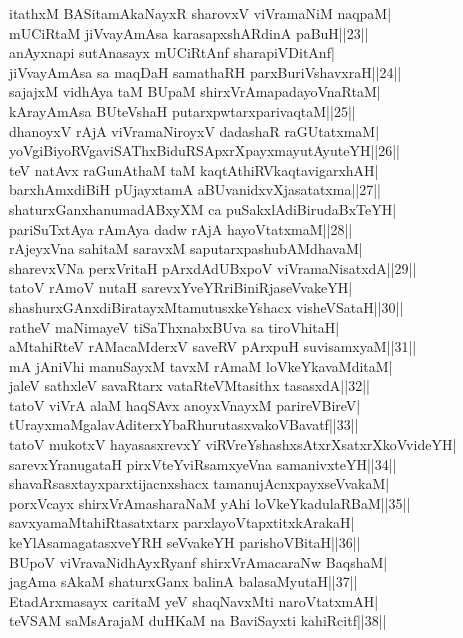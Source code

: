 \documentclass{article}
\begin{document}
itathxM BASitamAkaNayxR sharovxV viVramaNiM naqpaM|\\
mUCiRtaM jiVvayAmAsa karasapxshARdinA paBuH||23||\\
anAyxnapi sutAnasayx mUCiRtAnf sharapiVDitAnf|\\
jiVvayAmAsa sa maqDaH samathaRH parxBuriVshavxraH||24||\\
sajajxM vidhAya taM BUpaM shirxVrAmapadayoVnaRtaM|\\
kArayAmAsa BUteVshaH putarxpwtarxparivaqtaM||25||\\
dhanoyxV rAjA viVramaNiroyxV dadashaR raGUtatxmaM|\\
yoVgiBiyoRVgaviSAThxBiduRSApxrXpayxmayutAyuteYH||26||\\
teV natAvx raGunAthaM taM kaqtAthiRVkaqtavigarxhAH|\\
barxhAmxdiBiH pUjayxtamA aBUvanidxvXjasatatxma||27||\\
shaturxGanxhanumadABxyXM ca puSakxlAdiBirudaBxTeYH|\\
pariSuTxtAya rAmAya dadw rAjA hayoVtatxmaM||28||\\
rAjeyxVna sahitaM saravxM saputarxpashubAMdhavaM|\\
sharevxVNa perxVritaH pArxdAdUBxpoV viVramaNisatxdA||29||\\
tatoV rAmoV nutaH sarevxYveYRriBiniRjaseVvakeYH|\\
shashurxGAnxdiBiratayxMtamutusxkeYshacx visheVSataH||30||\\
ratheV maNimayeV tiSaThxnabxBUva sa tiroVhitaH|\\
aMtahiRteV rAMacaMderxV saveRV pArxpuH suvisamxyaM||31||\\
mA jAniVhi manuSayxM tavxM rAmaM loVkeYkavaMditaM|\\
jaleV sathxleV savaRtarx vataRteVMtasithx tasasxdA||32||\\
tatoV viVrA alaM haqSAvx anoyxVnayxM parireVBireV|\\
tUrayxmaMgalavAditerxYbaRhurutasxvakoVBavatf||33||\\
tatoV mukotxV hayasasxrevxY viRVreYshashxsAtxrXsatxrXkoVvideYH|\\
sarevxYranugataH pirxVteYviRsamxyeVna samanivxteYH||34||\\
shavaRsasxtayxparxtijacnxshacx tamanujAcnxpayxseVvakaM|\\
porxVcayx shirxVrAmasharaNaM yAhi loVkeYkadulaRBaM||35||\\
savxyamaMtahiRtasatxtarx parxlayoVtapxtitxkArakaH|\\
keYlAsamagatasxveYRH seVvakeYH parishoVBitaH||36||\\
BUpoV viVravaNidhAyxRyanf shirxVrAmacaraNw BaqshaM|\\
jagAma sAkaM shaturxGanx balinA balasaMyutaH||37||\\
EtadArxmasayx caritaM yeV shaqNavxMti naroVtatxmAH|\\
teVSAM saMsArajaM duHKaM na BaviSayxti kahiRcitf||38||
\end{document}
